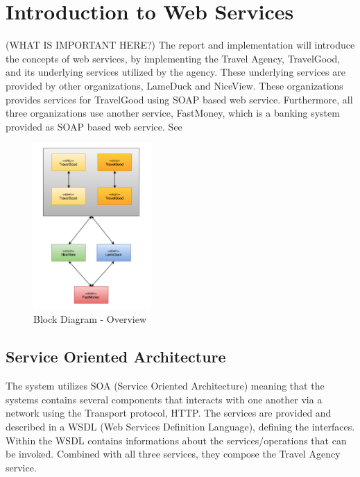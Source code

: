 \section{Introduction to Web Services}
(WHAT IS IMPORTANT HERE?)
The report and implementation will introduce the concepts of web services, by implementing the Travel Agency, TravelGood, and its underlying services utilized by the agency. These underlying services are provided by other organizations, LameDuck and NiceView. These organizations provides services for TravelGood using SOAP based web service. Furthermore, all three organizations use another service, FastMoney, which is a banking system provided as SOAP based web service. See 


\begin{figure}[h!]
\centering
\includegraphics[width=0.4\textwidth]{Figures/BlockDiagramOverView.png}
\caption{Block Diagram - Overview}
\label{fig:BlockDiagramOverView}
\end{figure}

\subsection{Service Oriented Architecture}
\label{sub:Service Oriented Architecture}

The system utilizes SOA (Service Oriented Architecture) meaning that the systems contains several components that interacts with one another via a network using the Transport protocol, HTTP. The services are provided and described in a WSDL (Web Services Definition Language), defining the interfaces. Within the WSDL contains informations about the services/operations that can be invoked. Combined with all three services, they compose the Travel Agency service.

